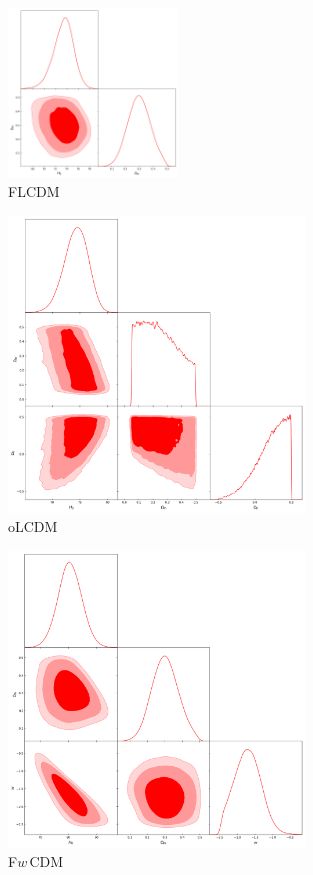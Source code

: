 \documentclass{cosmo}
\begin{document}
    
    \begin{figure}[h]
        \centering
        \includegraphics[width=0.4\textwidth]{H0LiCOW-FLCDM-allN.png}
        \caption{FLCDM}
        \label{fig10}
    \end{figure}
    \begin{figure}[h]
        \centering
        \includegraphics[width=0.7\textwidth]{H0LiCOW-oLCDM-allN.png}
        \caption{oLCDM}
        \label{fig11}
    \end{figure}
    \begin{figure}[h]
        \centering
        \includegraphics[width=0.7\textwidth]{H0LiCOW-FwCDM-allN.png}
        \caption{F$w\,$CDM}
        \label{fig12}
    \end{figure}
\end{document}
